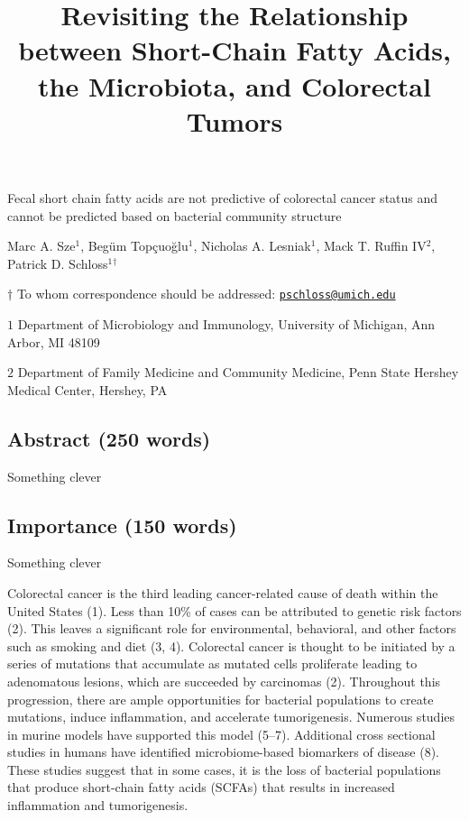 \documentclass[11pt,]{article}
\title{Revisiting the Relationship between Short-Chain Fatty Acids, the
Microbiota, and Colorectal Tumors}
\author{}
\date{}
\begin{document}
\maketitle

\vspace{35mm}

Fecal short chain fatty acids are not predictive of colorectal cancer
status and cannot be predicted based on bacterial community structure

\vspace{35mm}

Marc A. Sze\({^1}\), Begüm Topçuoğlu\({^1}\), Nicholas A.
Lesniak\({^1}\), Mack T. Ruffin IV\({^2}\), Patrick D.
Schloss\({^1}\)\({^\dagger}\)

\vspace{40mm}

\(\dagger\) To whom correspondence should be addressed:
\href{mailto:pschloss@umich.edu}{\nolinkurl{pschloss@umich.edu}}

\(1\) Department of Microbiology and Immunology, University of Michigan,
Ann Arbor, MI 48109

\(2\) Department of Family Medicine and Community Medicine, Penn State
Hershey Medical Center, Hershey, PA

\newpage
\linenumbers

\hypertarget{abstract-250-words}{%
\subsection{Abstract (250 words)}\label{abstract-250-words}}

Something clever

\hypertarget{importance-150-words}{%
\subsection{Importance (150 words)}\label{importance-150-words}}

Something clever

\newpage

Colorectal cancer is the third leading cancer-related cause of death
within the United States (1). Less than 10\% of cases can be attributed
to genetic risk factors (2). This leaves a significant role for
environmental, behavioral, and other factors such as smoking and diet
(3, 4). Colorectal cancer is thought to be initiated by a series of
mutations that accumulate as mutated cells proliferate leading to
adenomatous lesions, which are succeeded by carcinomas (2). Throughout
this progression, there are ample opportunities for bacterial
populations to create mutations, induce inflammation, and accelerate
tumorigenesis. Numerous studies in murine models have supported this
model (5--7). Additional cross sectional studies in humans have
identified microbiome-based biomarkers of disease (8). These studies
suggest that in some cases, it is the loss of bacterial populations that
produce short-chain fatty acids (SCFAs) that results in increased
inflammation and tumorigenesis.
\end{document}
